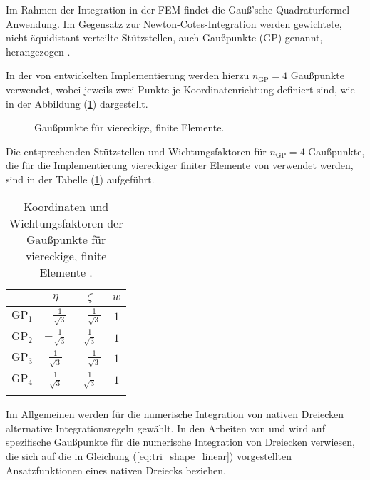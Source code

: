 Im Rahmen der Integration in der FEM findet die Gauß'sche Quadraturformel Anwendung. 
Im Gegensatz zur Newton-Cotes-Integration werden gewichtete, nicht äquidistant verteilte Stützstellen, auch Gaußpunkte (GP) genannt, herangezogen \citep{Gross2023}.

In der von \cite{Hackenberg2016} entwickelten Implementierung werden hierzu $n_{\mathrm{GP}} = 4$ Gaußpunkte verwendet, wobei jeweils zwei Punkte je Koordinatenrichtung definiert sind, wie in der Abbildung (\ref{fig:GP_Hackenberg}) dargestellt.
\begin{figure}[H]
	\hspace*{55mm}
	
	\caption{Gaußpunkte für viereckige, finite Elemente.}
	\label{fig:GP_Hackenberg}
\end{figure}
Die entsprechenden Stützstellen und Wichtungsfaktoren für $n_{\mathrm{GP}} = 4$ Gaußpunkte, die für die Implementierung viereckiger finiter Elemente von \cite{Hackenberg2016} verwendet werden, sind in der Tabelle (\ref{tab:Gp_Hackenberg}) aufgeführt.\\
\begin{table}[htb]\centering
	{\small
		\setlength{\tabcolsep}{10pt}            %
		\renewcommand{\arraystretch}{1.25}      %
		\begin{tabular}{@{}lccc@{}}            %
			\firsthline
			& $\eta$                 & $\zeta$                & $w$ \\\hline
			$\mathrm{GP}_1$  & $-\tfrac{1}{\sqrt{3}}$   & $-\tfrac{1}{\sqrt{3}}$   & $1$   \\
			$\mathrm{GP}_2$  & $-\tfrac{1}{\sqrt{3}}$   &  $\tfrac{1}{\sqrt{3}}$     & $1$   \\
			$\mathrm{GP}_3$  &  $\tfrac{1}{\sqrt{3}}$     & $-\tfrac{1}{\sqrt{3}}$   & $1$   \\
			$\mathrm{GP}_4$  &  $\tfrac{1}{\sqrt{3}}$     &  $\tfrac{1}{\sqrt{3}}$     & $1$   \\\lasthline
	\end{tabular}}
	\caption{Koordinaten und Wichtungsfaktoren der Gaußpunkte für viereckige, finite Elemente \citep{Hackenberg2016}.}
	\label{tab:Gp_Hackenberg}
\end{table}

Im Allgemeinen werden für die numerische Integration von nativen Dreiecken alternative Integrationsregeln gewählt. 
In den Arbeiten von \cite{Gross2023} und \cite{Zienkiewicz2013} wird auf spezifische Gaußpunkte für die numerische Integration von Dreiecken verwiesen, die sich auf die in Gleichung (\ref{eq:tri_shape_linear}) vorgestellten Ansatzfunktionen eines nativen Dreiecks beziehen.

